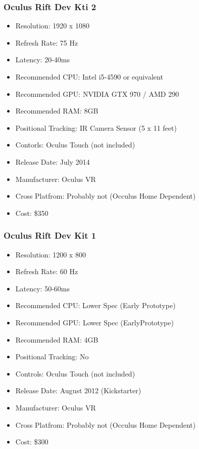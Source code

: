 \documentclass[a4paper,10pt]{article}
\begin{document}
\subsubsection{Oculus Rift Dev Kti 2}
\begin{itemize}
 \item Resolution: 1920 x 1080
 \item Refresh Rate: 75 Hz
 \item Latency: 20-40ms
 \item Recommended CPU: Intel i5-4590 or equivalent
 \item Recommended GPU: NVIDIA GTX 970 / AMD 290 
 \item Recommended RAM: 8GB
 \item Positional Tracking: IR Camera Sensor (5 x 11 feet)
 \item Contorls: Oculus Touch (not included)
 \item Release Date: July 2014
 \item Manufacturer: Oculus VR
 \item Cross Platfrom: Probably not (Occulus Home Dependent)
 \item Cost: \$350
\end{itemize}

\subsubsection{Oculus Rift Dev Kit 1}
\begin{itemize}
 \item Resolution: 1200 x 800
 \item Refresh Rate: 60 Hz
 \item Latency: 50-60ms
 \item Recommended CPU: Lower Spec (Early Prototype)
 \item Recommended GPU: Lower Spec (EarlyPrototype)
 \item Recommended RAM: 4GB
 \item Positional Tracking: No
 \item Controls: Oculus Touch (not included)
 \item Release Date: August 2012 (Kickstarter)
 \item Manufacturer: Oculus VR
 \item Cross Platfrom: Probably not (Occulus Home Dependent)
 \item Cost: \$300
\end{itemize}
	
\end{document}
